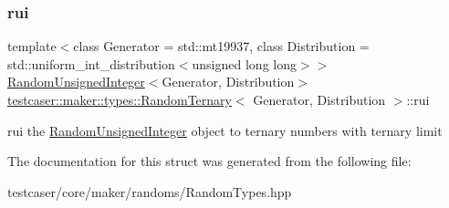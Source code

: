 \subsubsection{\texorpdfstring{rui}{rui}}
{\footnotesize\ttfamily template$<$class Generator = std\+::mt19937, class Distribution = std\+::uniform\+\_\+int\+\_\+distribution$<$unsigned long long$>$$>$ \\
\mbox{\hyperlink{classtestcaser_1_1maker_1_1types_1_1RandomUnsignedInteger}{Random\+Unsigned\+Integer}}$<$Generator, Distribution$>$ \mbox{\hyperlink{structtestcaser_1_1maker_1_1types_1_1RandomTernary}{testcaser\+::maker\+::types\+::\+Random\+Ternary}}$<$ Generator, Distribution $>$\+::rui}



rui the \mbox{\hyperlink{classtestcaser_1_1maker_1_1types_1_1RandomUnsignedInteger}{Random\+Unsigned\+Integer}} object to ternary numbers with ternary limit 



The documentation for this struct was generated from the following file\+:\begin{DoxyCompactItemize}
\item 
testcaser/core/maker/randoms/Random\+Types.\+hpp\end{DoxyCompactItemize}
